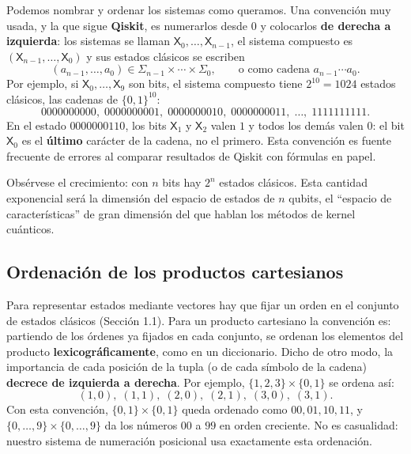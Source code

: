 \documentclass[11pt, a4paper, twoside, openright]{report}
\begin{document}
\begin{tcolorbox}[colback=blue!5!white,colframe=blue!75!black,title=\textbf{Nota Aclaratoria: La convención de Qiskit (numeración de derecha a izquierda)}]
Podemos nombrar y ordenar los sistemas como queramos. Una convención muy usada, y la que sigue \textbf{Qiskit}, es numerarlos desde $0$ y colocarlos \textbf{de derecha a izquierda}: los sistemas se llaman $\mathsf{X}_0, \dots, \mathsf{X}_{n-1}$, el sistema compuesto es $(\mathsf{X}_{n-1}, \dots, \mathsf{X}_0)$ y sus estados clásicos se escriben
\[ (a_{n-1}, \dots, a_0) \in \Sigma_{n-1} \times \cdots \times \Sigma_0, \qquad \text{o como cadena } a_{n-1} \cdots a_0. \]
Por ejemplo, si $\mathsf{X}_0, \dots, \mathsf{X}_9$ son bits, el sistema compuesto tiene $2^{10} = 1024$ estados clásicos, las cadenas de $\{0,1\}^{10}$:
\[ 0000000000,\; 0000000001,\; 0000000010,\; 0000000011,\; \dots,\; 1111111111. \]
En el estado $0000000110$, los bits $\mathsf{X}_1$ y $\mathsf{X}_2$ valen $1$ y todos los demás valen $0$: el bit $\mathsf{X}_0$ es el \textbf{último} carácter de la cadena, no el primero. Esta convención es fuente frecuente de errores al comparar resultados de Qiskit con fórmulas en papel.
\end{tcolorbox}

\noindent Obsérvese el crecimiento: con $n$ bits hay $2^n$ estados clásicos. Esta cantidad exponencial será la dimensión del espacio de estados de $n$ qubits, el ``espacio de características'' de gran dimensión del que hablan los métodos de kernel cuánticos.

\subsection{Ordenación de los productos cartesianos}

\noindent Para representar estados mediante vectores hay que fijar un orden en el conjunto de estados clásicos (Sección 1.1). Para un producto cartesiano la convención es: partiendo de los órdenes ya fijados en cada conjunto, se ordenan los elementos del producto \textbf{lexicográficamente}, como en un diccionario. Dicho de otro modo, la importancia de cada posición de la tupla (o de cada símbolo de la cadena) \textbf{decrece de izquierda a derecha}. Por ejemplo, $\{1,2,3\} \times \{0,1\}$ se ordena así:
\[ (1,0),\; (1,1),\; (2,0),\; (2,1),\; (3,0),\; (3,1). \]
Con esta convención, $\{0,1\} \times \{0,1\}$ queda ordenado como $00, 01, 10, 11$, y $\{0,\dots,9\} \times \{0,\dots,9\}$ da los números $00$ a $99$ en orden creciente. No es casualidad: nuestro sistema de numeración posicional usa exactamente esta ordenación.
\end{document}

